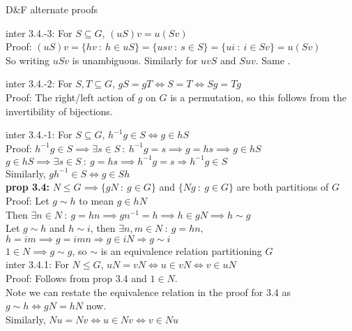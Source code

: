 \documentclass{article}
\newcommand{\hcm}[1][1]{\hspace{#1 cm}}
\newcommand{\imp}{\Rightarrow}
\newcommand{\st}{\ : \ }
\begin{document}
\begin{center}
D\&F alternate proofs
\end{center}
\begin{flushleft}
\hangindent=1.1cm 


inter 3.4.-3: For $S\subseteq G$, $(uS)v = u(Sv)$\\\hcm
Proof: $(uS)v = \{hv \st h\in uS\} = \{usv \st s \in S\} = \{ui \st i \in Sv\} = u(Sv)$\\\hcm
So writing $uSv$ is unambiguous. Similarly for $uvS$ and $Suv$. Same .\\\hcm


inter 3.4.-2: For $S, T \subseteq G$, $gS = gT \iff S = T \iff Sg = Tg$\\\hcm
Proof: The right/left action of $g$ on $G$ is a permutation, so this follows from the invertibility of bijections.\\\hcm


inter 3.4.-1: For $S\subseteq G$, $h^{-1}g \in S \iff g \in hS$\\[2pt]\hcm
Proof: $h^{-1}g \in S \implies \exists s\in S \st h^{-1}g = s \implies g = hs \implies g \in hS$\\\hcm
$g \in hS \implies \exists s \in S \st g = hs \implies h^{-1}g = s \imp h^{-1}g \in S$\\[3pt]\hcm
Similarly, $gh^{-1}\in S \iff g\in Sh$\\[12pt]

\textbf{prop 3.4: } $N \leq G \implies \{gN \st g \in G\} $ and $\{Ng \st g \in G\}$ are both partitions of $G$\\\hcm
Proof: Let $g \sim h$ to mean $g \in hN$\\\hcm
Then $\exists n\in N \st g = hn \implies gn^{-1} = h \implies h \in gN \implies h \sim g$\\\hcm
Let $g\sim h$ and $h\sim i$, then $\exists n,m\in N \st g = hn,$ $h = im \implies g = imn \imp g \in iN \imp g\sim i$\\\hcm
$1\in N \implies g\sim g$, so $\sim$ is an equivalence relation partitioning $G$\\[12pt]

inter 3.4.1: For $N\leq G$, $uN = vN \iff u \in vN \iff v \in uN$\\\hcm
Proof: Follows from prop 3.4 and $1 \in N$.\\\hcm Note we can restate the equivalence relation in the proof for 3.4 as $g \sim h \iff gN = hN$ now.\\\hcm
Similarly, $Nu = Nv \iff u \in Nv \iff v \in Nu$\\[12pt]


\end{flushleft}
\end{document}
